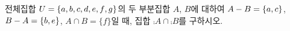 전체집합 $U=\{a{,}\mkern3mu\mathopen{}b{,}\mkern3mu\mathopen{}c{,}\mkern3mu\mathopen{}d{,}\mkern3mu\mathopen{}e{,}\mkern3mu\mathopen{}f{,}\mkern3mu\mathopen{}g\}$의 두 부분집합 $A$, $B$에 대하여 $A-B=\{a{,}\mkern3mu\mathopen{}c\}$, $B-A=\{b{,}\mkern3mu\mathopen{}e\}$, $A\cap B=\{f\}$일 때, 집합 $\comp{A}\cap\comp{B}$를 구하시오.
